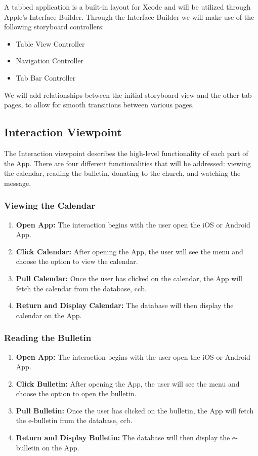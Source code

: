 \documentclass[letterpaper,10pt,draftclsnofoot,onecolumn,titlepage]{IEEEtran}
\begin{document}
			A tabbed application is a built-in layout for Xcode and will be utilized through Apple's Interface Builder.
			Through the Interface Builder we will make use of the following storyboard controllers:
			\begin{itemize}
				\item Table View Controller
				\item Navigation Controller
				\item Tab Bar Controller
			\end{itemize}
			We will add relationships between the initial storyboard view and the other tab pages, to allow for smooth transitions between various pages.

		\subsection{Interaction Viewpoint}
			The Interaction viewpoint describes the high-level functionality of each part of the \gls{App}.
			There are four different functionalities that will be addressed: viewing the calendar, reading the bulletin, donating to the church, and watching the message.

			\subsubsection{Viewing the Calendar}
				\begin{enumerate}
					\item \textbf{Open \Gls{App}:} The interaction begins with the user open the \gls{iOS} or \gls{Android} \gls{App}.
					\item \textbf{Click Calendar:} After opening the \gls{App}, the user will see the menu and choose the option to view the calendar.
					\item \textbf{Pull Calendar:} Once the user has clicked on the calendar, the \gls{App} will fetch the calendar from the database, \gls{ccb}.
					\item \textbf{Return and Display Calendar:} The database will then display the calendar on the \gls{App}.
				\end{enumerate}

			\subsubsection{Reading the Bulletin}
				\begin{enumerate}
					\item \textbf{Open \Gls{App}:} The interaction begins with the user open the \gls{iOS} or \gls{Android} \gls{App}.
					\item \textbf{Click Bulletin:} After opening the \gls{App}, the user will see the menu and choose the option to open the bulletin.
					\item \textbf{Pull Bulletin:} Once the user has clicked on the bulletin, the \gls{App} will fetch the e-bulletin from the database, \gls{ccb}.
					\item \textbf{Return and Display Bulletin:} The database will then display the e-bulletin on the \gls{App}.
				\end{enumerate}
\end{document}
